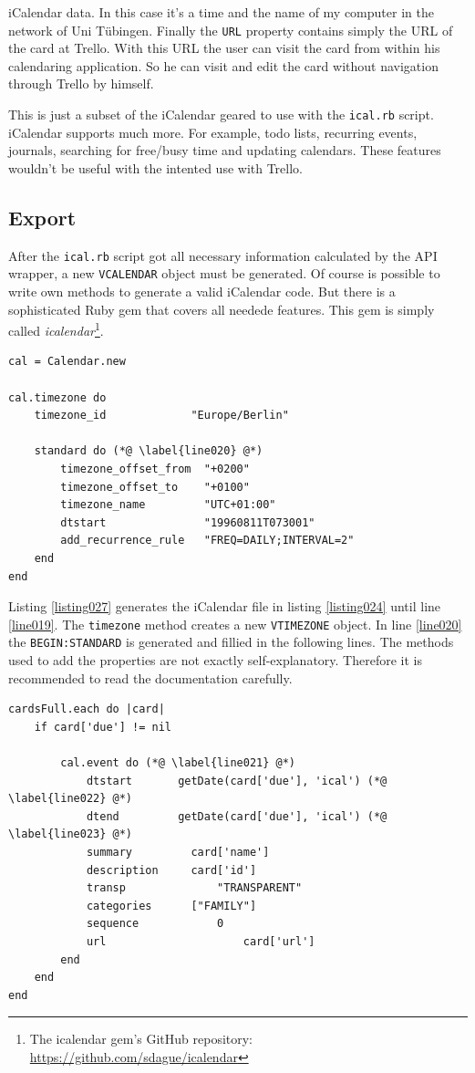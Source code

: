 iCalendar data. In this case it's a time and the name of my computer in the network of Uni Tübingen. Finally the \lstinline{URL} property contains simply the URL of the card at Trello. With this URL the user can visit the card from within his calendaring application. So he can visit and edit the card without navigation through Trello by himself. \cite{ical:specs}

This is just a subset of the iCalendar geared to use with the \texttt{ical.rb} script. iCalendar supports much more. For example, todo lists, recurring events, journals, searching for free/busy time and updating calendars. These features wouldn't be useful with the intented use with Trello. 

\subsection{Export}

After the \texttt{ical.rb} script got all necessary information calculated by the API wrapper, a new \lstinline{VCALENDAR} object must be generated. Of course is possible to write own methods to generate a valid iCalendar code. But there is a sophisticated Ruby gem that covers all needede features. This gem is simply called \emph{icalendar}\footnote{The icalendar gem's GitHub repository: \url{https://github.com/sdague/icalendar}}.

\begin{lstlisting}[aboveskip=1\baselineskip, caption=Generating a new \lstinline{VCALENDAR}., label=listing027]
cal = Calendar.new

cal.timezone do
	timezone_id             "Europe/Berlin"
	
	standard do (*@ \label{line020} @*)
		timezone_offset_from  "+0200"
		timezone_offset_to    "+0100"
		timezone_name         "UTC+01:00"
		dtstart               "19960811T073001"
		add_recurrence_rule   "FREQ=DAILY;INTERVAL=2"
	end
end
\end{lstlisting}

Listing \ref{listing027} generates the iCalendar file in listing \ref{listing024} until line \ref{line019}. The \lstinline{timezone} method creates a new \lstinline{VTIMEZONE} object. In line \ref{line020} the \lstinline{BEGIN:STANDARD} is generated and fillied in the following lines. The methods used to add the properties ​​are not exactly self-explanatory. Therefore it is recommended to read the documentation carefully.

\begin{lstlisting}[aboveskip=1\baselineskip, style=bash, caption=Generating the \lstinline{VEVENT} object., label=listing027]
cardsFull.each do |card|
	if card['due'] != nil	
		
		cal.event do (*@ \label{line021} @*)
			dtstart       getDate(card['due'], 'ical') (*@ \label{line022} @*)
			dtend         getDate(card['due'], 'ical') (*@ \label{line023} @*)
			summary     	card['name']
			description 	card['id']
			transp				"TRANSPARENT"
			categories		["FAMILY"]
			sequence			0
			url						card['url']
		end		
	end
end
\end{lstlisting}

